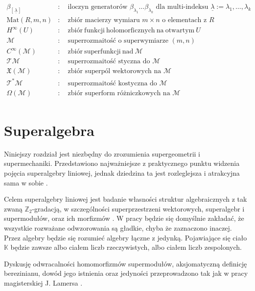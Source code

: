 \documentclass[11pt,a4paper]{report}
\theoremstyle{definition}
\begin{document}
\begin{equation*}
\begin{aligned}
\beta_{\left[\, \underline{\lambda}\, \right]}&: \quad \textrm{iloczyn generatorów }\beta_{\lambda_1} \ldots \beta_{\lambda_k} \textrm{ dla multi-indeksu }\underline{\lambda} := \lambda_1,\ldots,\lambda_k \\
\mathrm{Mat}(R,m,n)&: \quad \textrm{zbiór macierzy wymiaru } m \times n \textrm{ o elementach z }R \\
H^\infty(U)&: \quad \mathrm{zbiór\ funkcji\ holomorficznych\ na\ otwartym\ } U \\
\mathcal{M}&: \quad \textrm{superrozmaitość o superwymiarze } (m,n) \\
C^\infty(\mathcal{M})&: \quad \mathrm{zbiór\ superfunkcji\ nad\ } \mathcal M \\
\mathcal{TM}&: \quad \textrm{superrozmaitość styczna do }\mathcal{M} \\
\mathfrak X(\mathcal M)&: \quad \textrm{zbiór superpól wektorowych na }\mathcal{M} \\
\mathcal{T^*M}&: \quad \textrm{superrozmaitość kostyczna do }\mathcal{M} \\
\Omega(\mathcal{M})&: \quad \textrm{zbiór superform różniczkowych na }\mathcal{M} \\
\end{aligned}
\end{equation*}

\chapter{Superalgebra}

Niniejszy rozdział jest niezbędny do zrozumienia supergeometrii i supermechaniki. Przedstawiono najważniejsze z praktycznego punktu widzenia pojęcia superalgebry liniowej, jednak dziedzina ta jest rozleglejsza i atrakcyjna sama w sobie \cite{Co12,Du08,KT99,LZ17,Sa08,Tr99}.

Celem superalgebry liniowej jest badanie własności struktur algebraicznych z tak zwaną $\mathbb{Z}_2$-gradacją, w szczególności superprzestrzeni wektorowych, superalgebr i supermodułów, oraz ich morfizmów \cite{leites,rogers}.
W pracy będzie się domyślnie zakładać, że wszystkie rozważane odwzorowania są gładkie, chyba że zaznaczono inaczej. Przez algebry będzie się rozumieć algebry łączne z jedynką. Pojawiające się ciało $\mathbb{K}$ będzie zawsze albo ciałem liczb rzeczywistych, albo ciałem liczb zespolonych.

Dyskusję odwracalności homomorfizmów supermodułów, aksjomatyczną definicję berezinianu, dowód jego istnienia oraz jedyności przeprowadzono tak jak w pracy magisterskiej J. Lamersa \cite{lamers}.
\end{document}
